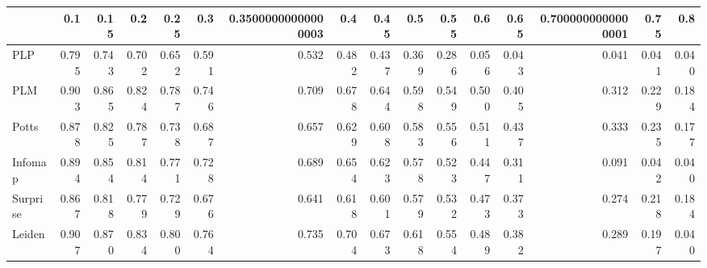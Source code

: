 \begin{tabular}{lrrrrrrrrrrrrrrr}
\toprule
{} &   0.1 &  0.15 &   0.2 &  0.25 &   0.3 & 0.35000000000000003 &   0.4 &  0.45 &   0.5 &  0.55 &   0.6 &  0.65 & 0.7000000000000001 &  0.75 &   0.8 \\
\midrule
PLP      & 0.795 & 0.743 & 0.702 & 0.652 & 0.591 &               0.532 & 0.482 & 0.437 & 0.369 & 0.286 & 0.056 & 0.043 &              0.041 & 0.041 & 0.040 \\
PLM      & 0.903 & 0.865 & 0.824 & 0.787 & 0.746 &               0.709 & 0.678 & 0.644 & 0.598 & 0.549 & 0.500 & 0.405 &              0.312 & 0.229 & 0.184 \\
Potts    & 0.878 & 0.825 & 0.787 & 0.738 & 0.687 &               0.657 & 0.629 & 0.608 & 0.583 & 0.556 & 0.511 & 0.437 &              0.333 & 0.235 & 0.177 \\
Infomap  & 0.894 & 0.854 & 0.814 & 0.771 & 0.728 &               0.689 & 0.654 & 0.623 & 0.578 & 0.523 & 0.447 & 0.311 &              0.091 & 0.042 & 0.040 \\
Surprise & 0.867 & 0.818 & 0.779 & 0.729 & 0.676 &               0.641 & 0.618 & 0.601 & 0.579 & 0.532 & 0.473 & 0.373 &              0.274 & 0.218 & 0.184 \\
Leiden   & 0.907 & 0.870 & 0.834 & 0.800 & 0.764 &               0.735 & 0.704 & 0.673 & 0.618 & 0.554 & 0.489 & 0.382 &              0.289 & 0.197 & 0.040 \\
\bottomrule
\end{tabular}
